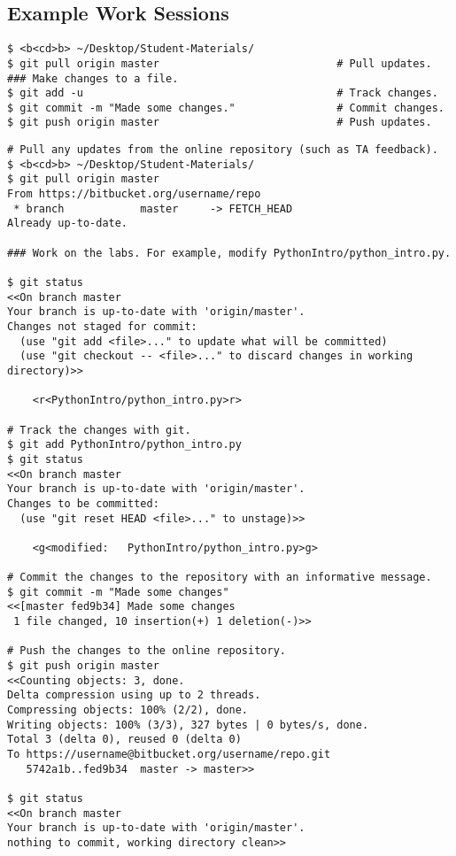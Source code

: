 
\subsection*{Example Work Sessions}

\begin{lstlisting}
$ <b<cd>b> ~/Desktop/Student-Materials/
$ git pull origin master                            # Pull updates.
### Make changes to a file.
$ git add -u                                        # Track changes.
$ git commit -m "Made some changes."                # Commit changes.
$ git push origin master                            # Push updates.
\end{lstlisting}

\begin{lstlisting}
# Pull any updates from the online repository (such as TA feedback).
$ <b<cd>b> ~/Desktop/Student-Materials/
$ git pull origin master
From https://bitbucket.org/username/repo
 * branch            master     -> FETCH_HEAD
Already up-to-date.

### Work on the labs. For example, modify PythonIntro/python_intro.py.

$ git status
<<On branch master
Your branch is up-to-date with 'origin/master'.
Changes not staged for commit:
  (use "git add <file>..." to update what will be committed)
  (use "git checkout -- <file>..." to discard changes in working directory)>>

    <r<PythonIntro/python_intro.py>r>

# Track the changes with git.
$ git add PythonIntro/python_intro.py
$ git status
<<On branch master
Your branch is up-to-date with 'origin/master'.
Changes to be committed:
  (use "git reset HEAD <file>..." to unstage)>>

    <g<modified:   PythonIntro/python_intro.py>g>

# Commit the changes to the repository with an informative message.
$ git commit -m "Made some changes"
<<[master fed9b34] Made some changes
 1 file changed, 10 insertion(+) 1 deletion(-)>>

# Push the changes to the online repository.
$ git push origin master
<<Counting objects: 3, done.
Delta compression using up to 2 threads.
Compressing objects: 100% (2/2), done.
Writing objects: 100% (3/3), 327 bytes | 0 bytes/s, done.
Total 3 (delta 0), reused 0 (delta 0)
To https://username@bitbucket.org/username/repo.git
   5742a1b..fed9b34  master -> master>>

$ git status
<<On branch master
Your branch is up-to-date with 'origin/master'.
nothing to commit, working directory clean>>
\end{lstlisting}
